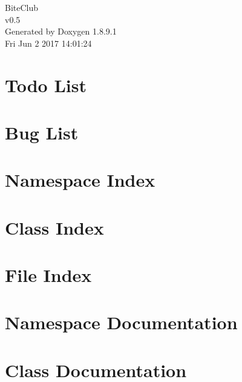 \documentclass[twoside]{book}
\newcommand{\+}{\discretionary{\mbox{\scriptsize$\hookleftarrow$}}{}{}}
\newcommand{\clearemptydoublepage}{%
  \newpage{\pagestyle{empty}\cleardoublepage}%
}
\begin{document}
\hypersetup{pageanchor=false,
             bookmarks=true,
             bookmarksnumbered=true,
             pdfencoding=unicode
            }
\begin{titlepage}
\vspace*{7cm}
\begin{center}%
{\Large Bite\+Club \\[1ex]\large v0.\+5 }\\
\vspace*{1cm}
{\large Generated by Doxygen 1.8.9.1}\\
\vspace*{0.5cm}
{\small Fri Jun 2 2017 14:01:24}\\
\end{center}
\end{titlepage}
\clearemptydoublepage
\tableofcontents
\clearemptydoublepage
{}
\hypersetup{pageanchor=true}

\chapter{Todo List}
\label{todo}
\hypertarget{todo}{}

\chapter{Bug List}
\label{bug}
\hypertarget{bug}{}

\chapter{Namespace Index}

\chapter{Class Index}

\chapter{File Index}

\chapter{Namespace Documentation}






\chapter{Class Documentation}





















\end{document}
